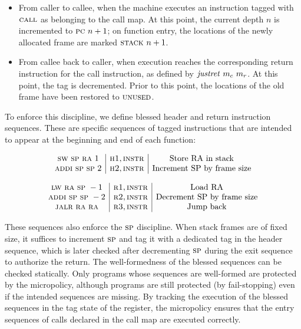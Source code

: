 \documentclass[acmsmall,review,anonymous]{acmart}\settopmatter{printfolios=true,printccs=false,printacmref=false}
\begin{document}
\begin{itemize}

\item From caller to callee, when the machine executes an instruction tagged
  with $\textsc{call}$ as belonging to the call map. At this point, the current
  {\PCname} depth $n$ is incremented to $\textsc{pc} ~ n + 1$; on function entry,
  the locations of the newly allocated frame are marked $\textsc{stack} ~ n + 1$.

\item From callee back to caller, when execution reaches the corresponding
  return instruction for the call instruction, as defined by
  $\mathit{justret}\ m_c\ m_r$. At this point, the {\PCname} tag is decremented.
  Prior to this point, the locations of the old frame have been restored to
  $\textsc{unused}$.

\end{itemize}

To enforce this discipline, we define blessed header and return instruction
sequences. These are specific sequences of tagged instructions that are intended
to appear at the beginning and end of each function:

\[
  \begin{array}{c|c|c}
    {\textsc{sw}~ \textsc{sp}~ \textsc{ra}~ 1} & {\textsc{h1}, \textsc{instr}} & \text{Store RA in stack} \\
    {\textsc{addi} ~ \textsc{sp} ~ \textsc{sp} ~ 2} & {\textsc{h2}, \textsc{instr}} & \text{Increment SP by frame size}
  \end{array}
  \]

\[
  \begin{array}{c|c|c}
    {\textsc{lw}~ \textsc{ra}~ \textsc{sp}~ -1} & {\textsc{r1}, \textsc{instr}} & \text{Load RA} \\
    {\textsc{addi} ~ \textsc{sp} ~ \textsc{sp} ~ -2} & {\textsc{r2}, \textsc{instr}} & \text{Decrement SP by frame size} \\
    {\textsc{jalr} ~ \textsc{ra} ~ \textsc{ra}} & {\textsc{r3}, \textsc{instr}} & \text{Jump back}
  \end{array}
\]


These sequences also enforce the $\textsc{sp}$ discipline. When stack frames
are of fixed size, it suffices to increment $\textsc{sp}$ and tag it with a
dedicated tag in the header sequence, which is later checked after
decrementing $\textsc{sp}$ during the exit sequence to authorize the
return. The well-formedness of the blessed sequences can be checked
statically. Only programs whose sequences are well-formed are
protected by the micropolicy, although programs are still protected
(by fail-stopping) even if the intended sequences are missing. By
tracking the execution of the blessed sequences in the tag state of
the {\PCname} register, the micropolicy ensures that the entry
sequences of calls declared in the call map are executed correctly.
\end{document}
